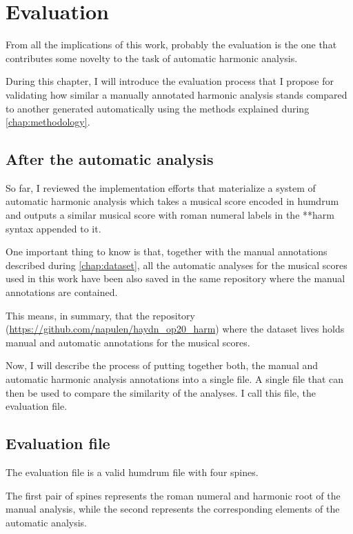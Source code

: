 \chapter{Evaluation}
\label{chap:evaluation}
From all the implications of this work, probably the evaluation is the one that contributes some novelty to the task of automatic harmonic analysis.

During this chapter, I will introduce the evaluation process that I propose for validating how similar a manually annotated harmonic analysis stands compared to another generated automatically using the methods explained during \autoref{chap:methodology}.

\section{After the automatic analysis}
So far, I reviewed the implementation efforts that materialize a system of automatic harmonic analysis which takes a musical score encoded in humdrum and outputs a similar musical score with roman numeral labels in the **harm syntax appended to it.

One important thing to know is that, together with the manual annotations described during \autoref{chap:dataset}, all the automatic analyses for the musical scores used in this work have been also saved in the same repository where the manual annotations are contained.

This means, in summary, that the repository (\url{https://github.com/napulen/haydn_op20_harm}) where the dataset lives holds manual and automatic annotations for the musical scores.

Now, I will describe the process of putting together both, the manual and automatic harmonic analysis annotations into a single file. A single file that can then be used to compare the similarity of the analyses. I call this file, the evaluation file.

\section{Evaluation file}
	The evaluation file is a valid humdrum file with four spines.

	The first pair of spines represents the roman numeral and harmonic root of the manual analysis, while the second represents the corresponding elements of the automatic analysis.

